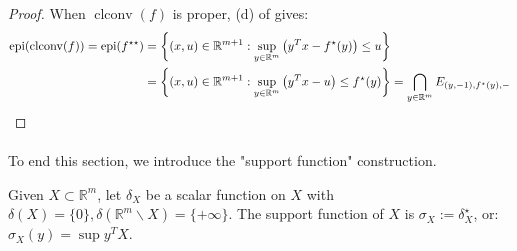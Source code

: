 \begin{proof}
	When $\operatorname{clconv}(f)$ is proper, (d) of  gives:
	\begin{align*}
		\operatorname{epi}(\operatorname{clconv}(f)) =\operatorname{epi}(f^{\star\star}) & =\left\{
		(x,u)\in \mathbb{R}^{m+1}:\sup_{y\in \mathbb{R}^m} \left(y^Tx-f^\star(y)\right)\leq u
		\right\}                                                                                    \\
		                                                                                 & =\left\{
		(x,u)\in \mathbb{R}^{m+1}:\sup_{y\in \mathbb{R}^m} \left(y^Tx-u\right)\leq f^\star(y)
		\right\}                                                                           =\bigcap_{y\in \mathbb{R}^m}E_{(y,-1),f^\star(y),-}\qedhere{}
	\end{align*}
\end{proof}

\paragraph{}To end this section, we introduce the "support function" construction.

\begin{defn}\label{defn:025-indicator-function}
	Given $X\subset \mathbb{R}^m$, let $\delta_X$ be a scalar function on $X$ with $\delta(X)=\{0\},\delta(\mathbb{R}^m\smallsetminus X)=\{+\infty\}$. The support function of $X$ is $\sigma_X:=\delta_X^{\star}$, or: $\sigma_X(y)=\sup y^TX$.
\end{defn}


